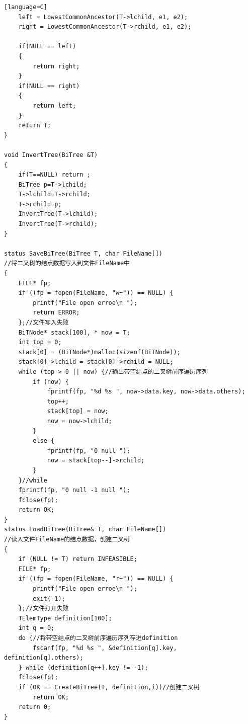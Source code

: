 \documentclass[supercite]{Experimental_Report}
\theoremstyle{definition}
\begin{document}
\begin{sloppypar}
\begin{lstlisting}[breaklines][language=C]
    left = LowestCommonAncestor(T->lchild, e1, e2);
    right = LowestCommonAncestor(T->rchild, e1, e2);

    if(NULL == left)
    {
        return right;
    }
    if(NULL == right)
    {
        return left;
    }
    return T;
}

void InvertTree(BiTree &T)
{
	if(T==NULL) return ;
	BiTree p=T->lchild;
	T->lchild=T->rchild;
	T->rchild=p;
	InvertTree(T->lchild);
	InvertTree(T->rchild);
}

status SaveBiTree(BiTree T, char FileName[])
//将二叉树的结点数据写入到文件FileName中
{
	FILE* fp;
	if ((fp = fopen(FileName, "w+")) == NULL) {
		printf("File open erroe\n ");
		return ERROR;
	};//文件写入失败
	BiTNode* stack[100], * now = T;
	int top = 0;
	stack[0] = (BiTNode*)malloc(sizeof(BiTNode));
	stack[0]->lchild = stack[0]->rchild = NULL;
	while (top > 0 || now) {//输出带空结点的二叉树前序遍历序列
		if (now) {
			fprintf(fp, "%d %s ", now->data.key, now->data.others);
			top++;
			stack[top] = now;
			now = now->lchild;
		}
		else {
			fprintf(fp, "0 null ");
			now = stack[top--]->rchild;
		}
	}//while
	fprintf(fp, "0 null -1 null ");
	fclose(fp);
	return OK;
}
status LoadBiTree(BiTree& T, char FileName[])
//读入文件FileName的结点数据，创建二叉树
{
	if (NULL != T) return INFEASIBLE;
	FILE* fp;
	if ((fp = fopen(FileName, "r+")) == NULL) {
		printf("File open erroe\n ");
		exit(-1);
	};//文件打开失败
	TElemType definition[100];
	int q = 0;
	do {//将带空结点的二叉树前序遍历序列存进definition
		fscanf(fp, "%d %s ", &definition[q].key, definition[q].others);
	} while (definition[q++].key != -1);
	fclose(fp);
	if (OK == CreateBiTree(T, definition,i))//创建二叉树
		return OK;
	return 0;
}



\end{lstlisting}
\end{sloppypar}
\end{document}
